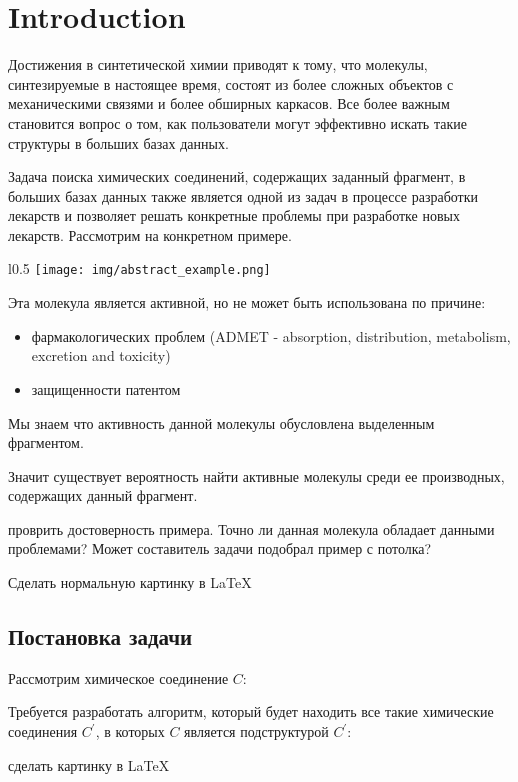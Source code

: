 \section{Introduction}


Достижения в синтетической химии приводят к тому, что молекулы, синтезируемые в настоящее время, состоят из более сложных объектов с механическими связями и более обширных каркасов. Все более важным становится вопрос о том, как пользователи могут эффективно искать такие структуры в больших базах данных.

Задача поиска химических соединений, содержащих заданный фрагмент, в больших базах данных также является одной из задач в процессе разработки лекарств и позволяет решать конкретные проблемы при разработке новых лекарств. Рассмотрим на конкретном примере.

{

\begin{wrapfigure}{l}{0.5\textwidth}
    \texttt{[image: img/abstract\_example.png]}
\end{wrapfigure}


Эта молекула является активной, но не может быть использована по причине:
\begin{itemize}
  \item фармакологических проблем (ADMET - absorption, distribution, metabolism, excretion and toxicity)
  \item защищенности патентом
\end{itemize}

Мы знаем что активность данной молекулы обусловлена выделенным фрагментом.

Значит существует вероятность найти активные молекулы среди ее производных, содержащих данный фрагмент.

}

{\color{red} проврить достоверность примера. Точно ли данная молекула обладает данными проблемами? Может составитель задачи подобрал пример с потолка?

Сделать нормальную картинку в \LaTeX}


\subsection{Постановка задачи}

Рассмотрим химическое соединение $C$:

\begin{center}
\end{center}

Требуется разработать алгоритм, который будет находить все такие химические соединения $C^{'}$, в которых $C$ является подструктурой $C^{'}$:

\begin{figure}[h]
  \label{figure:result}
\end{figure}

{\color{red} сделать картинку в \LaTeX}

